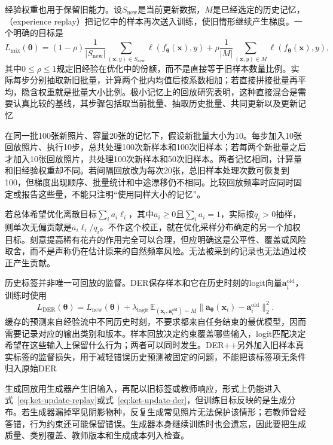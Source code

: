 经验权重也用于保留旧能力。设$S_{\mathrm{new}}$是当前更新数据，$M$是已经选定的历史记忆，（experience replay）把记忆中的样本再次送入训练，使旧情形继续产生梯度。一个明确的目标是
\begin{equation}
L_{\mathrm{mix}}(\bm{\theta})
=(1-\rho)\frac{1}{|S_{\mathrm{new}}|}
\sum_{(\bm{x},y)\in S_{\mathrm{new}}}\ell(f_{\bm{\theta}}(\bm{x}),y)
+\rho\frac{1}{|M|}\sum_{(\bm{x},y)\in M}
\ell(f_{\bm{\theta}}(\bm{x}),y),
\label{eq:ket-update-replay}
\end{equation}
其中$0\le\rho\le1$规定旧经验在优化中的份额，而不是直接等于旧样本数量比例。实际每步分别抽取新旧批量，计算两个批内均值后按系数相加；若直接拼接批量再平均，隐含权重就是批量大小比例。极小记忆上的回放研究表明，这种直接混合是需要认真比较的基线，其步骤包括取当前批量、抽取历史批量、共同更新以及更新记忆

在同一批100张新照片、容量20张的记忆下，假设新批量大小为10。每步加入10张回放照片、执行10步，总共处理100次新样本和100次旧样本；若每两个新批量之后才加入10张回放照片，共处理100次新样本和50次旧样本。两者记忆相同，计算量和旧经验权重却不同。若间隔回放改为每次20张，总旧样本处理次数可恢复到100，但梯度出现顺序、批量统计和中途漂移仍不相同。比较回放频率时应同时固定或报告这些量，不能只注明“使用同样大小的记忆”。

若总体希望优化离散目标$\sum_i a_i\ell_i$，其中$a_i\ge0$且$\sum_i a_i=1$，实际按$q_i>0$抽样，则单次无偏贡献是$a_i\ell_i/q_i$。不作这个校正，就在优化采样分布确定的另一个加权目标。刻意提高稀有花卉的作用完全可以合理，但应明确这是公平性、覆盖或风险取舍，而不是声称仍在估计原来的自然频率风险。无法被采到的记录也无法通过校正产生贡献。

历史标签并非唯一可回放的监督。DER保存样本和它在历史时刻的logit向量$\bm a_i^{\mathrm{old}}$，训练时使用
\begin{equation}
L_{\mathrm{DER}}(\bm{\theta})
=L_{\mathrm{new}}(\bm{\theta})
+\lambda_{\mathrm{logit}}\,
\mathbb E_{(\bm{x}_i,\bm a_i^{\mathrm{old}})\sim M}
\lVert\bm a_{\bm{\theta}}(\bm{x}_i)-\bm a_i^{\mathrm{old}}\rVert_2^2.
\label{eq:ket-update-der}
\end{equation}
缓存的预测来自经验流中不同历史时刻，不要求都来自任务结束的最优模型，因而需要记录对应的输出类别和版本。样本回放决定约束覆盖哪些输入，logit匹配决定希望在这些输入上保留什么行为；两者可以同时发生。DER++另外加入旧样本真实标签的监督损失，用于减轻错误历史预测被固定的问题，不能把该标签项无条件归入原始DER

生成回放用生成器产生旧输入，再配以旧标签或教师响应，形式上仍能进入式~\eqref{eq:ket-update-replay}或式~\eqref{eq:ket-update-der}，但训练目标反映的是生成分布。若生成器漏掉罕见阴影物种，反复生成常见照片无法保护该情形；若教师曾经答错，行为约束还可能保留错误。生成器本身继续训练时也会遗忘，因此要把生成质量、类别覆盖、教师版本和生成成本列入检查。

